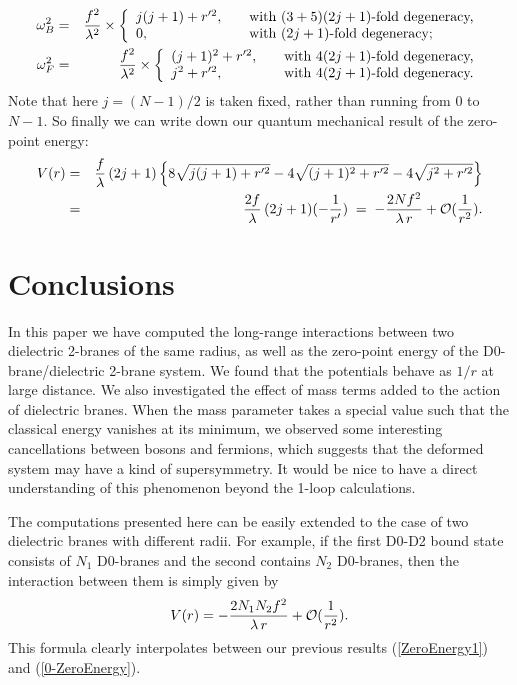 \documentclass[a4paper,12pt]{article}
\begin{document}
{\begin{eqnarray}
\omega_{B}^{2}&=&\frac{f^{2}}{\lambda^{2}}\times\left\{
                \begin{array}{ll}
                  j(j+1)+r'^{2},\quad & \hbox{with $(3+5)(2j+1)$-fold degeneracy,}\\
                    0, & \hbox{with $(2j+1)$-fold degeneracy;}
                \end{array}                  
\right.
\label{0-specB}\nonumber\\
\omega_{F}^{2}&=&\frac{f^{2}}{\lambda^{2}}\times
\left\{
             \begin{array}{ll}
                 (j+1)^{2} + r'^{2} ,\quad & \hbox{with $4(2j+1)$-fold degeneracy,}  \\             
             j^{2} + r'^{2}, \quad & \hbox{with $4(2j+1)$-fold degeneracy.}
             \end{array}
          \right.
\label{0-specF}
\end{eqnarray}
Note that here $j=(N-1)/2$ is taken fixed, rather than running from $0$ to $N-1$. So finally we can write down our quantum mechanical result of the zero-point energy:
\begin{eqnarray}
V(r) &=& \frac{f}{\lambda}\,(2j+1)\left\{
8\sqrt{j(j+1) + r'^2} - 4\sqrt{(j+1)^2 + r'^2}- 4\sqrt{j^2 + r'^2} \right\}\nonumber\\
&=& \frac{2f}{\lambda}\,(2j+1) (-\frac{1}{r'})\;=\; -\frac{2Nf^{2}}{\lambda\, r}+{\cal O}(\frac{1}{r^{2}}).
\label{0-ZeroEnergy}
\end{eqnarray}
\section{Conclusions} \label{s5}
In this paper we have computed the long-range interactions between two dielectric 2-branes of the same radius, as well as the zero-point energy of the D0-brane/dielectric 2-brane system. We found that the potentials behave as $1/r$ at large distance. We also investigated the effect of mass terms added to the action of dielectric branes. When the mass parameter takes a special value such that the classical energy vanishes at its minimum, we observed some interesting cancellations between bosons and fermions, which suggests that the deformed system may have a kind of supersymmetry. It would be nice to have a direct understanding of this phenomenon beyond the 1-loop calculations.

The computations presented here can be easily extended to the case of two dielectric branes with different radii. For example, if the first D0-D2 bound state consists of $N_{1}$ D0-branes and the second contains $N_{2}$ D0-branes, then the interaction between them is simply given by
\begin{equation}
V(r)=-\frac{2N_{1}N_{2}f^{2}}{\lambda\,r}+{\cal O}(\frac{1}{r^{2}}).
\end{equation}
This formula clearly interpolates between our previous results (\ref{ZeroEnergy1}) and (\ref{0-ZeroEnergy}).

}
\end{document}
